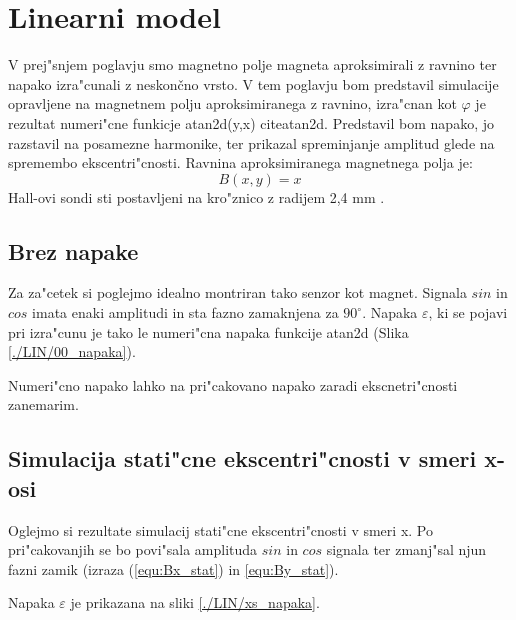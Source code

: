 \chapter{Linearni model}

V prej"snjem poglavju smo magnetno polje magneta aproksimirali z ravnino ter napako izra"cunali z neskončno vrsto. V tem poglavju bom predstavil simulacije opravljene na magnetnem polju aproksimiranega z ravnino, izra"cnan kot $\varphi$ je rezultat numeri"cne funkicje atan2d(y,x) citeatan2d. Predstavil bom napako, jo razstavil na posamezne harmonike, ter prikazal spreminjanje amplitud glede na spremembo ekscentri"cnosti. Ravnina aproksimiranega magnetnega polja je: 
\begin{equation}
\label{equ:lin_polje}
B(x,y)= x
\end{equation}
Hall-ovi sondi sti postavljeni na kro"znico z radijem 2,4 mm \cite{AM8192}.


\section{Brez napake}

Za za"cetek si poglejmo idealno montriran tako senzor kot magnet. Signala $sin$ in $cos$ imata enaki amplitudi in sta fazno zamaknjena za $90^{\circ}$. Napaka $\varepsilon$, ki se pojavi pri izra"cunu je tako le numeri"cna napaka funkcije atan2d (Slika \ref{./LIN/00_napaka}).

Numeri"cno napako lahko na pri"cakovano napako zaradi ekscnetri"cnosti zanemarim.


\newpage
\section{Simulacija stati"cne ekscentri"cnosti v smeri x-osi}

Oglejmo si rezultate simulacij stati"cne ekscentri"cnosti v smeri x. Po pri"cakovanjih se bo povi"sala amplituda $sin$ in $cos$ signala ter zmanj"sal njun fazni zamik (izraza (\ref{equ:Bx_stat}) in \ref{equ:By_stat}).
 
\newpage


Napaka $\varepsilon$  je prikazana na sliki \ref{./LIN/xs_napaka}.

